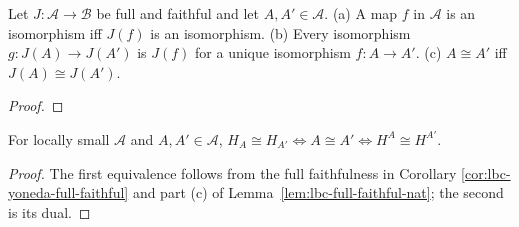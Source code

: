 \begin{lemma}
\label{lem:lbc-full-faithful-nat}
Let $J:\mathcal A\to\mathcal B$ be full and faithful and let $A,A'\in\mathcal A$.
(a) A map $f$ in $\mathcal A$ is an isomorphism iff $J(f)$ is an isomorphism.
(b) Every isomorphism $g:J(A)\to J(A')$ is $J(f)$ for a unique isomorphism
$f:A\to A'$. (c) $A\cong A'$ iff $J(A)\cong J(A')$.
\notready
\end{lemma}
\begin{proof}
\notready
\end{proof}

\begin{corollary}
\label{cor:lbc-representable-iso}
For locally small $\mathcal A$ and $A,A'\in\mathcal A$,
$H_A\cong H_{A'}\iff A\cong A'\iff H^A\cong H^{A'}$.
\end{corollary}
\begin{proof}
The first equivalence follows from the full faithfulness in Corollary
\ref{cor:lbc-yoneda-full-faithful} and part (c) of Lemma~\ref{lem:lbc-full-faithful-nat};
the second is its dual.
\end{proof}
